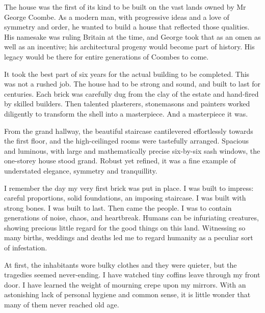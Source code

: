
% 

\prelude

The house was the first of its kind to be built on the vast lands
owned by Mr George Coombe. As a modern man, with progressive ideas and
a love of symmetry and order, he wanted to build a house that
reflected those qualities. His namesake was ruling Britain at the
time, and George took that as an omen as well as an incentive; his
architectural progeny would become part of history. His legacy would
be there for entire generations of Coombes to come.

It took the best part of six years for the actual building to be
completed. This was not a rushed job. The house had to be strong and
sound, and built to last for centuries. Each brick was carefully dug
from the clay of the estate and hand-fired by skilled builders. Then
talented plasterers, stonemasons and painters worked diligently to
transform the shell into a masterpiece. And a masterpiece it was.

From the grand hallway, the beautiful staircase cantilevered
effortlessly towards the first floor, and the high-ceilinged rooms
were tastefully arranged. Spacious and luminous, with large and
mathematically precise six-by-six sash windows, the one-storey house
stood grand. Robust yet refined, it was a fine example of understated
elegance, symmetry and tranquillity.
 
\fugue

I remember the day my very first brick was put in place. I was built
to impress: careful proportions, solid foundations, an imposing
staircase. I was built with strong bones. I was built to last. Then
came the people. I was to contain generations of noise, chaos, and
heartbreak. Humans can be infuriating creatures, showing precious
little regard for the good things on this land. Witnessing so many
births, weddings and deaths led me to regard humanity as a peculiar
sort of infestation.

At first, the inhabitants wore bulky clothes and they were quieter,
but the tragedies seemed never-ending. I have watched tiny coffins
leave through my front door. I have learned the weight of mourning
crepe upon my mirrors. With an astonishing lack of personal hygiene
and common sense, it is little wonder that many of them never reached
old age.

